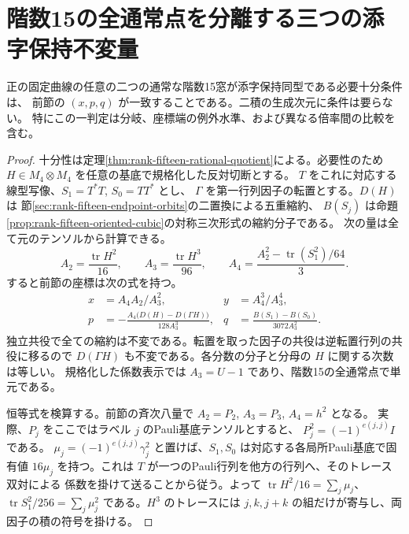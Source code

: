 \section{階数15の全通常点を分離する三つの添字保持不変量}
\label{sec:rank-fifteen-global-invariants}
\begin{theorem}\label{thm:rank-fifteen-global-invariants}
正の固定曲線の任意の二つの通常な階数15窓が添字保持同型である必要十分条件は、
前節の $(x,p,q)$ が一致することである。二積の生成次元に条件は要らない。
特にこの一判定は分岐、座標端の例外水準、および異なる倍率間の比較を含む。
\end{theorem}
\begin{proof}
十分性は定理\ref{thm:rank-fifteen-rational-quotient}による。必要性のため
$H\in M_4\otimes M_4$ を任意の基底で規格化した反対切断とする。
$T$ をこれに対応する線型写像、$S_1=T^*T$, $S_0=TT^*$ とし、
$\Gamma$ を第一行列因子の転置とする。$D(H)$ は
節\ref{sec:rank-fifteen-endpoint-orbits}の二置換による五重縮約、
$B(S_j)$ は命題\ref{prop:rank-fifteen-oriented-cubic}の対称三次形式の縮約分子である。
次の量は全て元のテンソルから計算できる。
\[
 A_2=\frac{\operatorname{tr}H^2}{16},\qquad
 A_3=\frac{\operatorname{tr}H^3}{96},\qquad
 A_4=\frac{A_2^2-\operatorname{tr}(S_1^2)/64}{3}.
\]
すると前節の座標は次の式を持つ。
\[
\begin{aligned}
 x&=A_4 A_2/A_3^2, &y&=A_4^3/A_3^4,\\
 p&=-\frac{A_4\bigl(D(H)-D(\Gamma H)\bigr)}{128 A_3^3},
 &q&=\frac{B(S_1)-B(S_0)}{3072 A_3^2}.
\end{aligned}
\]
独立共役で全ての縮約は不変である。転置を取った因子の共役は逆転置行列の共役に移るので
$D(\Gamma H)$ も不変である。各分数の分子と分母の $H$ に関する次数は等しい。
規格化した係数表示では $A_3=U-1$ であり、階数15の全通常点で単元である。

恒等式を検算する。前節の斉次八量で $A_2=P_2$, $A_3=P_3$, $A_4=h^2$ となる。
実際、$P_j$ をここではラベル $j$ のPauli基底テンソルとすると、
$P_j^2=(-1)^{e(j,j)}I$ である。
$\mu_j=(-1)^{e(j,j)}\gamma_j^2$ と置けば、$S_1,S_0$ は対応する各局所Pauli基底で固有値
$16\mu_j$ を持つ。これは $T$ が一つのPauli行列を他方の行列へ、そのトレース双対による
係数を掛けて送ることから従う。よって $\operatorname{tr}H^2/16=\sum_j\mu_j$、
$\operatorname{tr}S_1^2/256=\sum_j\mu_j^2$ である。$H^3$ のトレースには
$j,k,j+k$ の組だけが寄与し、両因子の積の符号を掛ける。


\end{proof}
